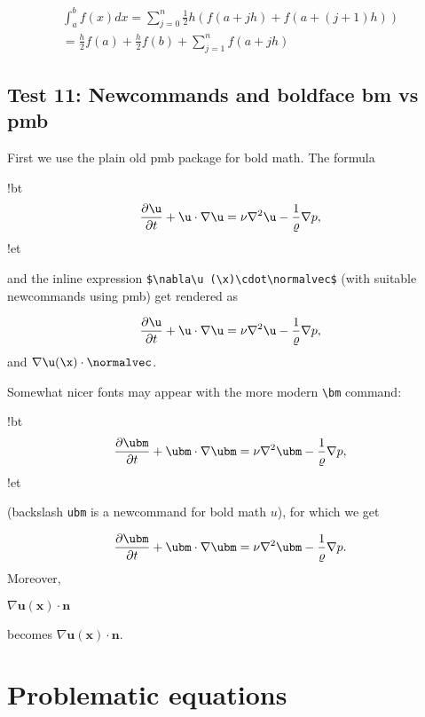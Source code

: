 \documentclass[%
oneside,                 %
final,                   %
10pt]{article}
\begin{document}
\begin{equation}
\begin{split}
\int_a^b f(x)dx = \sum_{j=0}^{n} \frac{1}{2} h(f(a+jh) +
f(a+(j+1)h)) \\ 
=\frac{h}{2}f(a) + \frac{h}{2}f(b) + \sum_{j=1}^n f(a+jh)
\end{split}
\end{equation}

\subsection{Test 11: Newcommands and boldface bm vs pmb}

First we use the plain old pmb package for bold math. The formula







\blatexcod
!bt
\[ \frac{\partial\u}{\partial t} +
\u\cdot\nabla\u = \nu\nabla^2\u -
\frac{1}{\varrho}\nabla p,\]
!et

\elatexcod

and the inline expression \Verb!$\nabla\u (\x)\cdot\normalvec$!
(with suitable newcommands using pmb)
get rendered as

\[ \frac{\partial\u}{\partial t} +
\u\cdot\nabla\u = \nu\nabla^2\u -
\frac{1}{\varrho}\nabla p,\]
and $\nabla\u (\x)\cdot\normalvec$.

Somewhat nicer fonts may appear with the more modern \Verb!\bm! command:







\blatexcod
!bt
\[ \frac{\partial\ubm}{\partial t} +
\ubm\cdot\nabla\ubm = \nu\nabla^2\ubm -
\frac{1}{\varrho}\nabla p,\]
!et

\elatexcod

(backslash \texttt{ubm} is a newcommand for bold math $u$), for which we get

\[ \frac{\partial\ubm}{\partial t} +
\ubm\cdot\nabla\ubm = \nu\nabla^2\ubm -
\frac{1}{\varrho}\nabla p.\]
Moreover,



\bccq
$\nabla\bm{u}(\bm{x})\cdot\bm{n}$

\eccq

becomes $\nabla\bm{u}(\bm{x})\cdot\bm{n}$.

\section{Problematic equations}
\end{document}
